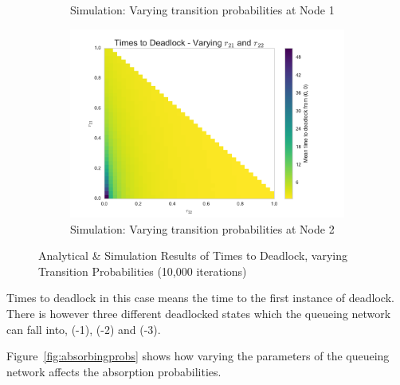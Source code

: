 \documentclass{article}
\begin{document}
\begin{figure}[!htbp]
\begin{subfigure}[b]{0.5\textwidth}
  \caption{Simulation: Varying transition probabilities at Node 1}
  \label{fig:heatmap_sim_1}
\end{subfigure}
\begin{subfigure}[b]{0.5\textwidth}
  \includegraphics[width=\textwidth]{images/N2_heatmap_sim}
  \caption{Simulation: Varying transition probabilities at Node 2}
  \label{fig:heatmap_sim_2}
\end{subfigure}
\caption{Analytical \& Simulation Results of Times to Deadlock, varying Transition Probabilities (10,000 iterations)}
\label{fig:heatmaps}
\end{figure}

Times to deadlock in this case means the time to the first instance of deadlock.
There is however three different deadlocked states which the queueing network can fall into, (-1), (-2) and (-3).

Figure~\ref{fig:absorbingprobs} shows how varying the parameters of the queueing network affects the absorption probabilities.
\end{document}
